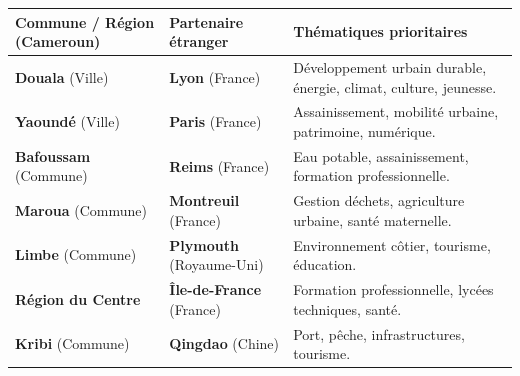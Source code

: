 \documentclass[11pt]{article}
\begin{document}
\begin{exemplebox}
\begin{center}
\begin{tabularx}{\linewidth}{|l|l|X|}\hline
\rowcolor{popblueL}
\textbf{Commune / Région (Cameroun)} & \textbf{Partenaire étranger} & \textbf{Thématiques prioritaires} \\ \hline
\textbf{Douala} (Ville) & \textbf{Lyon} (France) & Développement urbain durable, énergie, climat, culture, jeunesse. \\ \hline
\textbf{Yaoundé} (Ville) & \textbf{Paris} (France) & Assainissement, mobilité urbaine, patrimoine, numérique. \\ \hline
\textbf{Bafoussam} (Commune) & \textbf{Reims} (France) & Eau potable, assainissement, formation professionnelle. \\ \hline
\textbf{Maroua} (Commune) & \textbf{Montreuil} (France) & Gestion déchets, agriculture urbaine, santé maternelle. \\ \hline
\textbf{Limbe} (Commune) & \textbf{Plymouth} (Royaume-Uni) & Environnement côtier, tourisme, éducation. \\ \hline
\textbf{Région du Centre} & \textbf{Île-de-France} (France) & Formation professionnelle, lycées techniques, santé. \\ \hline
\textbf{Kribi} (Commune) & \textbf{Qingdao} (Chine) & Port, pêche, infrastructures, tourisme. \\ \hline
\end{tabularx}
\end{center}
\end{exemplebox}
\end{document}
